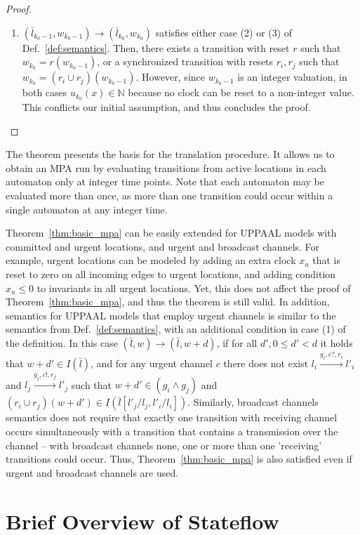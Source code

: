 \begin{proof}
\begin{enumerate}
\item  $(\bar{l}_{k_0-1},w_{k_0-1}) \rightarrow (\bar{l}_{k_0},w_{k_0})$ satisfies either case (2) or (3) of Def.~\ref{def:semantics}.  Then, there exists a transition with reset $r$ such that $w_{k_0}=r(w_{k_0-1})$, or a synchronized transition with resets $r_i,r_j$ such that $w_{k_0}=(r_i\cup r_j)(w_{k_0-1})$. 
However, since $w_{k_0-1}$ is an integer valuation, in both cases $u_{k_0}(x)\in\mathbb{N}$ because no clock can be reset to a non-integer value. 
This conflicts our initial assumption, and thus concludes the proof.
\vspace{-10pt}
\end{enumerate}
\end{proof}

The theorem presents the basis for the translation procedure. It allows us to obtain an MPA run by evaluating transitions from active locations in each automaton only at integer time points. Note that each automaton may be evaluated more than once, as more than one transition could occur within a single automaton at any integer time. 


Theorem~\ref{thm:basic_mpa} can be easily extended for UPPAAL models with committed and urgent locations, and urgent and broadcast channels. For example, urgent locations can be modeled by adding an extra clock $x_u$ that is reset to zero on all incoming edges to urgent locations, and adding condition $x_u\leq 0$ to invariants in all urgent locations. Yet, this does not affect the proof of Theorem~\ref{thm:basic_mpa}, and thus the theorem is still valid.  
In addition, semantics for UPPAAL models that employ urgent channels is similar to the semantics from Def.~\ref{def:semantics}, with an additional condition in case (1) of the definition. In this case $(\bar{l},w) \rightarrow (\bar{l},w+d)$, if for all $d', 0\leq d'< d$ it holds that $w+d'\in I(\bar{l})$, and for any urgent channel $c$ there does not exist $l_i \xrightarrow{g_i,c?,r_i} l'_i$ and $l_j \xrightarrow{g_j,c!,r_j} l'_j$ such that $w+d'\in (g_i\wedge g_j)$ and $(r_i \cup r_j)(w+d')\in I(\bar{l}[l'_j/l_j,l'_i/l_i])$. 
Similarly, broadcast channels semantics does not require that exactly one transition with receiving channel occurs simultaneously with a transition that contains a transmission over the channel -- with broadcast channels none, one or more than one 'receiving' transitions could occur. Thus, Theorem~\ref{thm:basic_mpa} is also satisfied even if urgent and broadcast channels are used. 


\section{Brief Overview of Stateflow}
\label{sec:sf}

